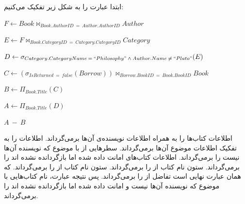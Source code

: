 \documentclass{article}
\begin{document}
\subsection{}
ابتدا عبارت را به شکل زیر تفکیک می‌کنیم:
\begin{center}
$
F
\leftarrow
Book
\bowtie_{Book.AuthorID\:=\:Author.AuthorID}
Author
$
\end{center}
\begin{center}
$
E
\leftarrow
F
\bowtie_{Book.CategoryID\:=\:Category.CategoryID}
Category
$
\end{center}
\begin{center}
$
D
\leftarrow
\sigma_{Category.CategoryName\:=\:``Philosophy"\:\wedge\:Author.Name\:\neq\:``Plato"}
(E)
$
\end{center}
\begin{center}
$
C
\leftarrow
(\sigma_{IsReturned\:=\:false}(Borrow))
\bowtie_{Borrow.BookID\:=\:Book.BookID}
Book
$
\end{center}
\begin{center}
$
B
\leftarrow
\Pi_{Book.Title}(C)
$
\end{center}
\begin{center}
$
A
\leftarrow
\Pi_{Book.Title}(D)
$
\end{center}
\begin{center}
$
A\:-\:B
$
\end{center}
اطلاعات کتاب‌ها را به همراه اطلاعات نویسنده‌ی آن‌ها برمی‌گرداند.
\newline
{}
اطلاعات
را به تفکیک اطلاعات موضوع آن‌ها برمی‌گرداند.
\newline
{}
سطرهایی از
با موضوع
که نویسنده آن‌ها
نیست را برمی‌گرداند.
\newline
{}
اطلاعات کتاب‌های امانت داده شده اما بازگردانده نشده اند را برمی‌گرداند.
\newline
{}
ستون نام کتاب از
را برمی‌گرداند.
\newline
{}
ستون نام کتاب از
را برمی‌گرداند.
\newline
{}
که همان عبارت نهایی است تفاضل
از
را برمی‌گرداند.
\newline
پس نتیجه عبارت، نام کتاب‌هایی با موضوع
که نویسنده آن‌ها
نیست و امانت داده شده اما بازگردانده نشده اند را برمی‌گرداند.
\end{document}

